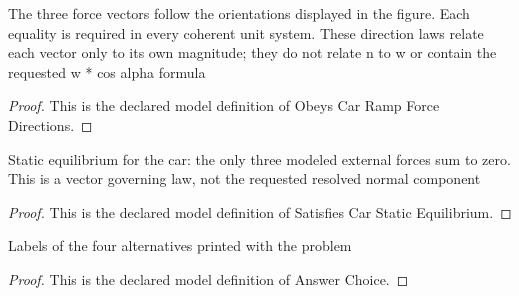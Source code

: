 \begin{definition}
  \label{def:physics:phyx-mini-0799:phyxminiproblems-problemphyxmini0799-obeyscarrampforcedirections}
  The three force vectors follow the orientations displayed in the figure. Each equality is required in every coherent unit system. These direction laws relate each vector only to its own magnitude; they do not relate n to w or contain the requested w * cos alpha formula
\end{definition}
\begin{proof}
  This is the declared model definition of Obeys Car Ramp Force Directions.
\end{proof}
\begin{definition}
  \label{def:physics:phyx-mini-0799:phyxminiproblems-problemphyxmini0799-satisfiescarstaticequilibrium}
  Static equilibrium for the car: the only three modeled external forces sum to zero. This is a vector governing law, not the requested resolved normal component
\end{definition}
\begin{proof}
  This is the declared model definition of Satisfies Car Static Equilibrium.
\end{proof}
\begin{definition}
  \label{def:physics:phyx-mini-0799:phyxminiproblems-problemphyxmini0799-answerchoice}
  Labels of the four alternatives printed with the problem
\end{definition}
\begin{proof}
  This is the declared model definition of Answer Choice.
\end{proof}
